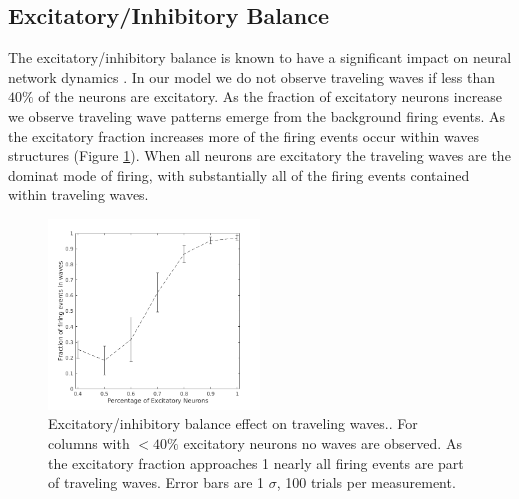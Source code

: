 \documentclass[a4paper,11pt]{article}
\begin{document}
\subsection{Excitatory/Inhibitory Balance} \label{sub:ei_balance}
The excitatory/inhibitory balance is known to have a significant impact on neural network dynamics \cite{keane2015}. 
In our model we do not observe traveling waves if less than $40\%$ of the neurons are excitatory.
As the fraction of excitatory neurons increase we observe traveling wave patterns emerge from the background firing events.
As the excitatory fraction increases more of the firing events occur within waves structures (Figure \ref{fig:excitatory_effect}).
When all neurons are excitatory the traveling waves are the dominat mode of firing, with substantially all of the firing events contained within traveling waves. \\
\begin{figure}[!htb]
 \caption{Excitatory/inhibitory balance effect on traveling waves.. 
	  For columns with $<40\%$ excitatory neurons no waves are observed.
	  As the excitatory fraction approaches 1 nearly all firing events are part of traveling waves.
	  Error bars are 1 $\sigma$, 100 trials per measurement.
	  }
 \label{fig:excitatory_effect}
 \centering
   \includegraphics[width=0.5\textwidth]{fig/ExcitatoryWaves}
\end{figure}
\end{document}
